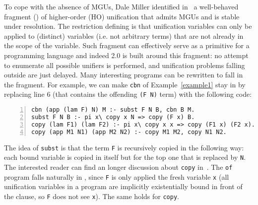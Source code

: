 \documentclass{llncs}
\begin{document}
To cope with the absence of MGUs, Dale Miller identified
in~\cite{Miller91alogic} a well-behaved fragment (\Ll{}) of higher-order (HO)
unification that admits MGUs and is stable under \lp{} resolution. 
The restriction defining \Ll{} is that unification variables can
only be applied to (distinct) variables (i.e. not arbitrary terms) that are
not already in the scope of the variable.
Such fragment can effectively serve as a primitive for a
programming language and indeed \tedius{} 2.0 is built around this fragment:
no attempt to enumerate all possible unifiers is performed, and unification
problems falling outside \Ll{} are just delayed.  Many interesting \lp{}
programs can be rewritten to fall in the fragment. For example, we can
make \verb+cbn+ of Example~\ref{example1} stay in \Ll{} by replacing
line 6 (that contains the offending \verb+(F N)+ term) with the following code:
\vspace{-0.4em}
\begin{center}
\small
\begin{minipage}{10cm}
\begin{Verbatim}[numbers=left,numbersep=1pt,frame=leftline]
cbn (app (lam F) N) M :- subst F N B, cbn B M.
subst F N B :- pi x\ copy x N => copy (F x) B.
copy (lam F1) (lam F2) :- pi x\ copy x x => copy (F1 x) (F2 x).
copy (app M1 N1) (app M2 N2) :- copy M1 M2, copy N1 N2.
\end{Verbatim}
\end{minipage}
\end{center}
\vspace{-0.3em}
The idea of \verb+subst+ is that the term \verb+F+ is recursively copied in
the following way: each bound variable is copied in itself but for the top one
that is replaced by \verb+N+.
The interested reader can find an longer discussion about \verb+copy+
in~\cite[page 199]{Miller:2012:PHL:2331097}.  
The \verb+of+ program falls naturally in \Ll{}, since \verb+F+ is only applied
the fresh variable \verb+x+ (all unification variables in a \lp{} program are
implicitly existentially bound in front of the clause, so \verb+F+ does not
see \verb+x+).  The same holds for \verb+copy+.
\end{document}
